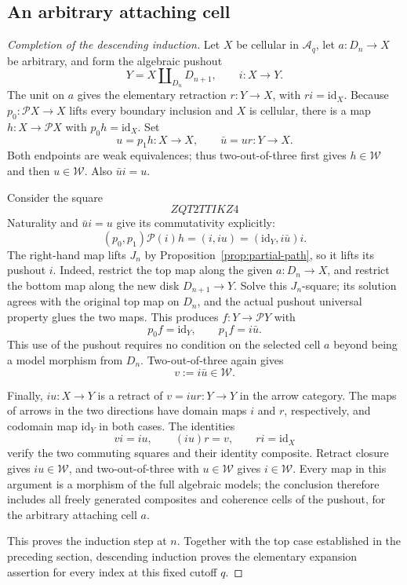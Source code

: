 \documentclass[11pt,letterpaper]{article}
\numberwithin{equation}{section}
\theoremstyle{plain}
\theoremstyle{definition}
\theoremstyle{remark}
\begin{document}
\subsection{An arbitrary attaching cell}

\begin{proof}[Completion of the descending induction]
Let \(X\) be cellular in \(\mathcal A_q\), let
\(a:D_n\to X\) be arbitrary, and form the algebraic pushout
\[
              Y=X\amalg_{D_n}D_{n+1},\qquad i:X\longrightarrow Y.
\]
The unit on \(a\) gives the elementary retraction
\(r:Y\to X\), with \(ri=\mathrm{id}_X\).  Because
\(p_0:\mathcal P X\to X\) lifts every boundary inclusion and
\(X\) is cellular, there is a map \(h:X\to\mathcal P X\)
with \(p_0h=\mathrm{id}_X\).  Set
\[
                  u=p_1h:X\longrightarrow X,
             \qquad \bar u=ur:Y\longrightarrow X.
\]
Both endpoints are weak equivalences; thus two-out-of-three first gives
\(h\in\mathcal W\) and then \(u\in\mathcal W\).
Also \(\bar u i=u\).

Consider the square
\begin{equation}\label{eq:partial-path-final-square}
ZQT2TTIKZ4
\end{equation}
Naturality and \(\bar u i=u\) give its commutativity explicitly:
\[
 (p_0,p_1)\mathcal P(i)h=(i,iu)
                         =(\mathrm{id}_Y,i\bar u)i.
\]
The right-hand map lifts \(J_n\) by
Proposition~\ref{prop:partial-path}, so it lifts its pushout \(i\).
Indeed, restrict the top map along the given \(a:D_n\to X\),
and restrict the bottom map along the new disk
\(D_{n+1}\to Y\).  Solve this \(J_n\)-square; its solution
agrees with the original top map on \(D_n\), and the actual pushout
universal property glues the two maps.  This produces
\(f:Y\to\mathcal P Y\) with
\[
                  p_0f=\mathrm{id}_Y,\qquad p_1f=i\bar u.
\]
This use of the pushout requires no condition on the selected cell
\(a\) beyond being a model morphism from \(D_n\).
Two-out-of-three again gives
\[
                         v:=i\bar u\in\mathcal W.
\]

Finally, \(iu:X\to Y\) is a retract of \(v=iur:Y\to Y\)
in the arrow category.  The maps of arrows in the two directions have
domain maps \(i\) and \(r\), respectively, and codomain map
\(\mathrm{id}_Y\) in both cases.  The identities
\[
                vi=iu,\qquad (iu)r=v,\qquad ri=\mathrm{id}_X
\]
verify the two commuting squares and their identity composite.
Retract closure gives \(iu\in\mathcal W\), and two-out-of-three
with \(u\in\mathcal W\) gives \(i\in\mathcal W\).
Every map in this argument is a morphism of the full algebraic models;
the conclusion therefore includes all freely generated composites and
coherence cells of the pushout, for the arbitrary attaching cell \(a\).

This proves the induction step at \(n\).  Together with the top
case established in the preceding section, descending induction proves
the elementary expansion assertion for every index at this fixed
cutoff \(q\).
\end{proof}
\end{document}
